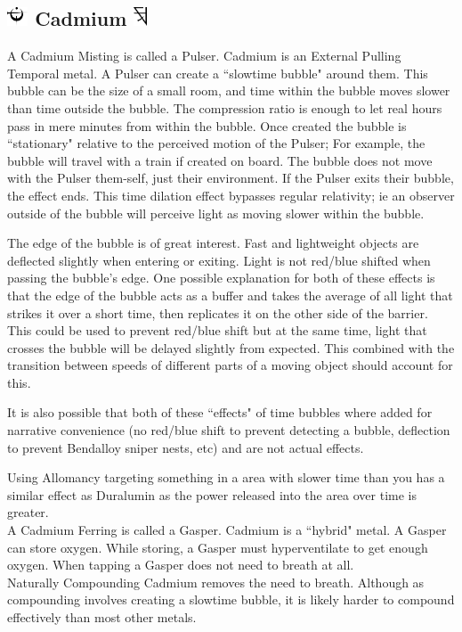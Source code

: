 \documentclass[conference]{IEEEtran}
\begin{document}
\subsection*{\includegraphics[height=1em]{images/Cadmium.png}  Cadmium \includegraphics[height=1em]{images/Cadmium_(Feruchemy).png}}
A Cadmium Misting is called a Pulser.  Cadmium is an External Pulling Temporal metal.  A Pulser can create a ``slowtime bubble" around them.  This bubble can be the size of a small room, and time within the bubble moves slower than time outside the bubble.  The compression ratio is enough to let real hours pass in mere minutes from within the bubble.  Once created the bubble is ``stationary" relative to the perceived motion of the Pulser; For example, the bubble will travel with a train if created on board.  The bubble does not move with the Pulser them-self, just their environment.  If the Pulser exits their bubble, the effect ends.  This time dilation effect bypasses regular relativity; ie an observer outside of the bubble will perceive light as moving slower within the bubble.

The edge of the bubble is of great interest.  Fast and lightweight objects are deflected slightly when entering or exiting.  Light is not red/blue shifted when passing the bubble's edge.  One possible explanation for both of these effects is that the edge of the bubble acts as a buffer and takes the average of all light that strikes it over a short time, then replicates it on the other side of the barrier.  This could be used to prevent red/blue shift but at the same time, light that crosses the bubble will be delayed slightly from expected.  This combined with the transition between speeds of different parts of a moving object should account for this.

It is also possible that both of these ``effects" of time bubbles where added for narrative convenience (no red/blue shift to prevent detecting a bubble, deflection to prevent Bendalloy sniper nests, etc) and are not actual effects.

Using Allomancy targeting something in a area with slower time than you has a similar effect as Duralumin as the power released into the area over time is greater.  \\

A Cadmium Ferring is called a Gasper.  Cadmium is a ``hybrid" metal.  A Gasper can store oxygen.  While storing, a Gasper must hyperventilate to get enough oxygen.  When tapping a Gasper does not need to breath at all.
\\
Naturally Compounding Cadmium removes the need to breath.  Although as compounding involves creating a slowtime bubble, it is likely harder to compound effectively than most other metals.\\
\end{document}
